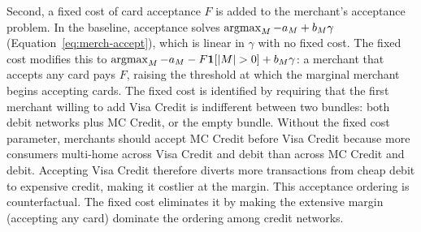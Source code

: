 \documentclass[main.tex]{subfiles}
\begin{document}
Second, a fixed cost of card acceptance $F$ is added to the merchant's acceptance problem.
In the baseline, acceptance solves $\argmax_M -a_M + b_M\gamma$ (Equation~\ref{eq:merch-accept}), which is linear in $\gamma$ with no fixed cost.
The fixed cost modifies this to $\argmax_M -a_M - F\mathbf{1}[|M|>0] + b_M\gamma$: a merchant that accepts any card pays $F$, raising the threshold at which the marginal merchant begins accepting cards.
The fixed cost is identified by requiring that the first merchant willing to add Visa Credit is indifferent between two bundles: both debit networks plus MC Credit, or the empty bundle.
Without the fixed cost parameter, merchants should accept MC Credit before Visa Credit because more consumers multi-home across Visa Credit and debit than across MC Credit and debit.
Accepting Visa Credit therefore diverts more transactions from cheap debit to expensive credit, making it costlier at the margin.
This acceptance ordering is counterfactual. The fixed cost eliminates it by making the extensive margin (accepting any card) dominate the ordering among credit networks.
\end{document}
